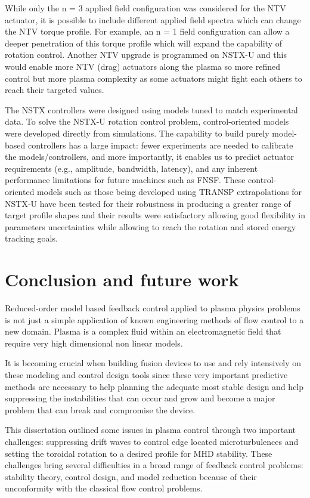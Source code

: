 \documentclass[12pt,lot, lof]{puthesis}
\begin{document}
While only the n = 3 applied field configuration was considered for the NTV actuator, it is possible to include different applied field spectra which can change the NTV torque profile. For example, an n = 1 field configuration can allow a deeper penetration of this torque profile which will expand the capability of rotation control. Another NTV upgrade is programmed on NSTX-U and this would enable more NTV (drag) actuators along the plasma so more refined control but more plasma complexity as some actuators might fight each others to reach their targeted values.

The NSTX controllers were designed using models tuned to match experimental data. To solve the NSTX-U rotation control problem, control-oriented models were developed directly from simulations. The capability to build purely model-based controllers has a large impact: fewer experiments are needed to calibrate the models/controllers, and more importantly, it enables us to predict actuator requirements (e.g., amplitude, bandwidth, latency), and any inherent performance limitations for future machines such as FNSF. These control-oriented models such as those being developed using TRANSP extrapolations for NSTX-U have been tested for their robustness in producing a greater range of target profile shapes and their results were satisfactory allowing good flexibility in parameters uncertainties while allowing to reach the rotation and stored energy tracking goals.


\chapter{Conclusion and future work}

Reduced-order model based feedback control applied to plasma physics problems is not just a simple application of known engineering methods of flow control to a new domain. Plasma is a complex fluid within an electromagnetic field that require very high dimensional  non linear models.
 
It is becoming crucial when building fusion devices to use and rely intensively on these modeling and control design tools since these very important predictive methods are necessary to help planning the adequate most stable design and help suppressing the instabilities that can occur and grow and become a major problem that can break and compromise the device. 

This dissertation outlined some issues in plasma control through two important challenges: suppressing drift waves to control edge located microturbulences and setting the toroidal rotation to a desired profile for MHD stability. These challenges bring several difficulties in a broad range of feedback control problems: stability theory, control design, and model reduction because of their unconformity with the classical flow control problems.
\end{document}
